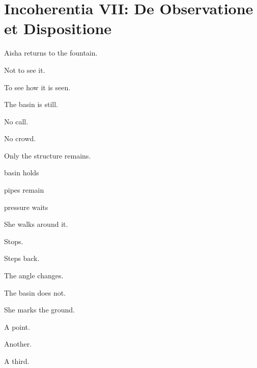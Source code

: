 
\chapter*{Incoherentia VII: De Observatione et Dispositione}


Aisha returns to the fountain.

Not to see it.

To see how it is seen.

\medskip

The basin is still.

No call.

No crowd.

\medskip

Only the structure remains.

\medskip

 basin holds

 pipes remain

 pressure waits

\medskip

She walks around it.

Stops.

Steps back.

\medskip

The angle changes.

The basin does not.

\medskip


\medskip

She marks the ground.

A point.

Another.

A third.

\medskip

